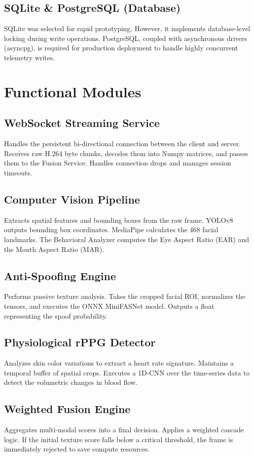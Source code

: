 \documentclass[12pt, a4paper]{report}
\begin{document}
\section{SQLite \& PostgreSQL (Database)}
SQLite was selected for rapid prototyping. However, it implements database-level locking during write operations. PostgreSQL, coupled with asynchronous drivers (asyncpg), is required for production deployment to handle highly concurrent telemetry writes.

\chapter{Functional Modules}

\section{WebSocket Streaming Service}
Handles the persistent bi-directional connection between the client and server. Receives raw H.264 byte chunks, decodes them into Numpy matrices, and passes them to the Fusion Service. Handles connection drops and manages session timeouts.

\section{Computer Vision Pipeline}
Extracts spatial features and bounding boxes from the raw frame. YOLOv8 outputs bounding box coordinates. MediaPipe calculates the 468 facial landmarks. The Behavioral Analyzer computes the Eye Aspect Ratio (EAR) and the Mouth Aspect Ratio (MAR).

\section{Anti-Spoofing Engine}
Performs passive texture analysis. Takes the cropped facial ROI, normalizes the tensors, and executes the ONNX MiniFASNet model. Outputs a float representing the spoof probability.

\section{Physiological rPPG Detector}
Analyzes skin color variations to extract a heart rate signature. Maintains a temporal buffer of spatial crops. Executes a 1D-CNN over the time-series data to detect the volumetric changes in blood flow.

\section{Weighted Fusion Engine}
Aggregates multi-modal scores into a final decision. Applies a weighted cascade logic. If the initial texture score falls below a critical threshold, the frame is immediately rejected to save compute resources.
\end{document}
